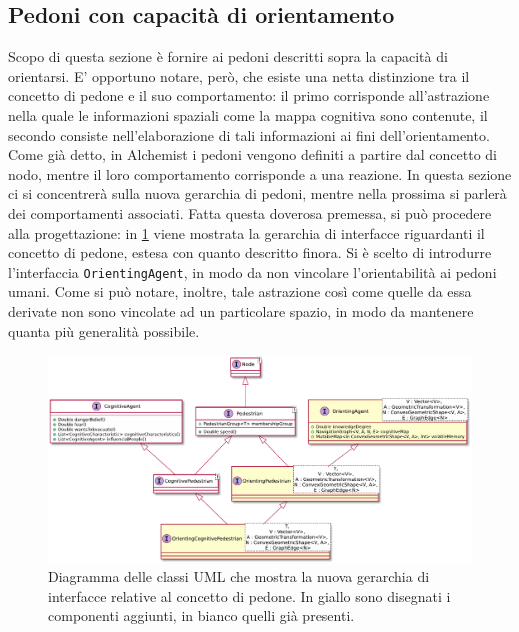 \documentclass[12pt,a4paper,openright,oneside]{book}
\begin{document}
\subsection{Pedoni con capacità di orientamento}
Scopo di questa sezione è fornire ai pedoni descritti sopra la capacità di orientarsi. E' opportuno notare, però, che esiste una netta distinzione tra il concetto di pedone e il suo comportamento: il primo corrisponde all'astrazione nella quale le informazioni spaziali come la mappa cognitiva sono contenute, il secondo consiste nell'elaborazione di tali informazioni ai fini dell'orientamento. Come già detto, in Alchemist i pedoni vengono definiti a partire dal concetto di nodo, mentre il loro comportamento corrisponde a una reazione. In questa sezione ci si concentrerà sulla nuova gerarchia di pedoni, mentre nella prossima si parlerà dei comportamenti associati. Fatta questa doverosa premessa, si può procedere alla progettazione: in \cref{fig:orienting-pedestrian-interfaces} viene mostrata la gerarchia di interfacce riguardanti il concetto di pedone, estesa con quanto descritto finora. Si è scelto di introdurre l'interfaccia \texttt{OrientingAgent}, in modo da non vincolare l'orientabilità ai pedoni umani. Come si può notare, inoltre, tale astrazione così come quelle da essa derivate non sono vincolate ad un particolare spazio, in modo da mantenere quanta più generalità possibile.
\begin{figure}
	\centering
	\includegraphics[width=\linewidth]{figures/orienting-pedestrian-interfaces.pdf}
	\caption{Diagramma delle classi UML che mostra la nuova gerarchia di interfacce relative al concetto di pedone. In giallo sono disegnati i componenti aggiunti, in bianco quelli già presenti.}
	\label{fig:orienting-pedestrian-interfaces}
\end{figure}
\end{document}
